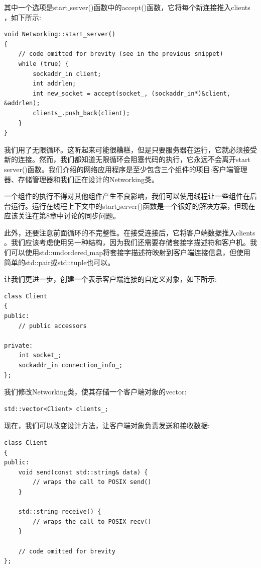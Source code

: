 其中一个选项是start\underline{ }server()函数中的accept()函数，它将每个新连接推入clients\underline{ }，如下所示: \par

\begin{lstlisting}[caption={}]
void Networking::start_server()
{
	// code omitted for brevity (see in the previous snippet)
	while (true) {
		sockaddr_in client;
		int addrlen;
		int new_socket = accept(socket_, (sockaddr_in*)&client, &addrlen);
		clients_.push_back(client);
	}
}
\end{lstlisting}

我们用了无限循环。这听起来可能很糟糕，但是只要服务器在运行，它就必须接受新的连接。然而，我们都知道无限循环会阻塞代码的执行，它永远不会离开start\underline{ }server()函数。我们介绍的网络应用程序是至少包含三个组件的项目:客户端管理器、存储管理器和我们正在设计的Networking类。 \par
一个组件的执行不得对其他组件产生不良影响，我们可以使用线程让一些组件在后台运行。运行在线程上下文中的start\underline{ }server()函数是一个很好的解决方案，但现在应该关注在第8章中讨论的同步问题。 \par
此外，还要注意前面循环的不完整性。在接受连接后，它将客户端数据推入clients\underline{ }。我们应该考虑使用另一种结构，因为我们还需要存储套接字描述符和客户机。我们可以使用std::undordered\underline{ }map将套接字描述符映射到客户端连接信息，但使用简单的std::pair或std::tuple也可以。 \par
让我们更进一步，创建一个表示客户端连接的自定义对象，如下所示: \par

\begin{lstlisting}[caption={}]
class Client
{
public:
	// public accessors
	
private:
	int socket_;
	sockaddr_in connection_info_;
};
\end{lstlisting}

我们修改Networking类，使其存储一个客户端对象的vector: \par

\begin{lstlisting}[caption={}]
std::vector<Client> clients_;
\end{lstlisting}

现在，我们可以改变设计方法，让客户端对象负责发送和接收数据: \par

\begin{lstlisting}[caption={}]
class Client
{
public:
	void send(const std::string& data) {
		// wraps the call to POSIX send()
	}

	std::string receive() {
		// wraps the call to POSIX recv()
	}

	// code omitted for brevity
};
\end{lstlisting}

